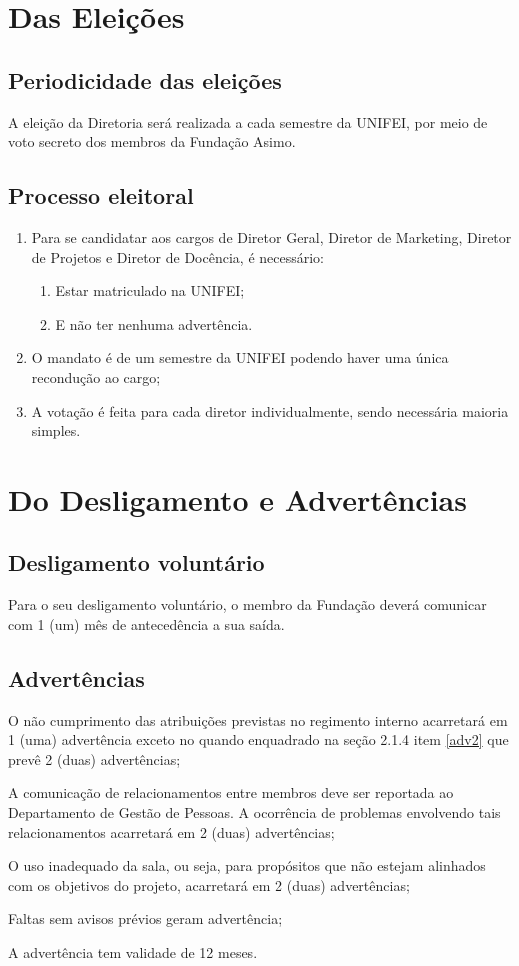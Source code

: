 \section{Das Eleições}
    \subsection{Periodicidade das eleições}
    A eleição da Diretoria será realizada a cada semestre da UNIFEI, por meio de voto secreto dos membros da Fundação Asimo.
    \subsection{Processo eleitoral}
    \begin{enumerate}
        \item Para se candidatar aos cargos de Diretor Geral, Diretor de Marketing, Diretor de Projetos e Diretor de Docência, é necessário:
        \begin{enumerate}
            \item Estar matriculado na UNIFEI;
            \item E não ter nenhuma advertência.
        \end{enumerate}
        \item O mandato é de um semestre da UNIFEI podendo haver uma única recondução ao cargo;
        \item A votação é feita para cada diretor individualmente, sendo necessária maioria simples.
    \end{enumerate}

\section{Do Desligamento e Advertências}
    \subsection{Desligamento voluntário}
        Para o seu desligamento voluntário, o membro da Fundação deverá comunicar com 1 (um) mês de antecedência a sua saída.
    \subsection{Advertências}
    \begin{enumerate}
        \item O não cumprimento das atribuições previstas no regimento interno acarretará em 1 (uma) advertência exceto no quando enquadrado na seção 2.1.4 item \ref{adv2} que prevê 2 (duas) advertências;
        {\color{red} \item A comunicação de relacionamentos entre membros deve ser reportada ao Departamento de Gestão de Pessoas. A ocorrência de problemas envolvendo tais relacionamentos acarretará em 2 (duas) advertências;
        \item O uso inadequado da sala, ou seja, para propósitos que não estejam alinhados com os objetivos do projeto, acarretará em 2 (duas) advertências;}
        \item Faltas sem avisos prévios geram advertência;
        \item A advertência tem validade de 12 meses.
    \end{enumerate}
